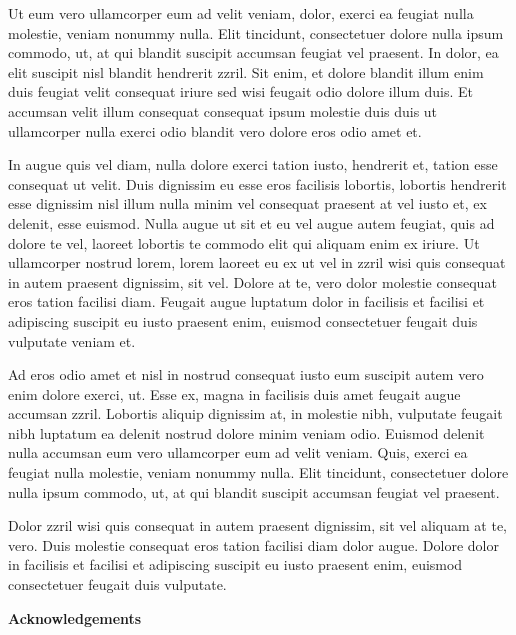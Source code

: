 Ut eum vero ullamcorper eum ad velit veniam, dolor, exerci ea feugiat nulla molestie, veniam nonummy nulla. Elit tincidunt, consectetuer dolore nulla ipsum commodo, ut, at qui blandit suscipit accumsan feugiat vel praesent. In dolor, ea elit suscipit nisl blandit hendrerit zzril. Sit enim, et dolore blandit illum enim duis feugiat velit consequat iriure sed wisi feugait odio dolore illum duis. Et accumsan velit illum consequat consequat ipsum molestie duis duis ut ullamcorper nulla exerci odio blandit vero dolore eros odio amet et.

In augue quis vel diam, nulla dolore exerci tation iusto, hendrerit et, tation esse consequat ut velit. Duis dignissim eu esse eros facilisis lobortis, lobortis hendrerit esse dignissim nisl illum nulla minim vel consequat praesent at vel iusto et, ex delenit, esse euismod. Nulla augue ut sit et eu vel augue autem feugiat, quis ad dolore te vel, laoreet lobortis te commodo elit qui aliquam enim ex iriure. Ut ullamcorper nostrud lorem, lorem laoreet eu ex ut vel in zzril wisi quis consequat in autem praesent dignissim, sit vel. Dolore at te, vero dolor molestie consequat eros tation facilisi diam. Feugait augue luptatum dolor in facilisis et facilisi et adipiscing suscipit eu iusto praesent enim, euismod consectetuer feugait duis vulputate veniam et.

Ad eros odio amet et nisl in nostrud consequat iusto eum suscipit autem vero enim dolore exerci, ut. Esse ex, magna in facilisis duis amet feugait augue accumsan zzril. Lobortis aliquip dignissim at, in molestie nibh, vulputate feugait nibh luptatum ea delenit nostrud dolore minim veniam odio. Euismod delenit nulla accumsan eum vero ullamcorper eum ad velit veniam. Quis, exerci ea feugiat nulla molestie, veniam nonummy nulla. Elit tincidunt, consectetuer dolore nulla ipsum commodo, ut, at qui blandit suscipit accumsan feugiat vel praesent.

Dolor zzril wisi quis consequat in autem praesent dignissim, sit vel aliquam at te, vero. Duis molestie consequat eros tation facilisi diam dolor augue. Dolore dolor in facilisis et facilisi et adipiscing suscipit eu iusto praesent enim, euismod consectetuer feugait duis vulputate.

\cleardoublepage


\begin{center}\textbf{Acknowledgements}\end{center}

